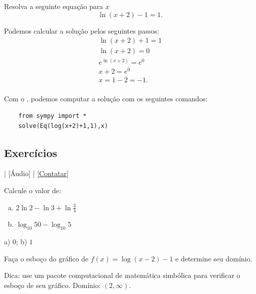\begin{exeresol}
  Resolva a seguinte equação para $x$
  \begin{equation}
    \ln(x+2) - 1 = 1. 
  \end{equation}
\end{exeresol}
\begin{resol}
  Podemos calcular a solução pelos seguintes passos:
  \begin{gather}
    \ln(x+2)+1=1\\
    \ln(x+2)=0\\
    e^{\ln(x+2)} = e^0\\
    x+2=e^0\\
    x=1-2=-1.\\
  \end{gather}

  \ifispython
  Com o {\sympy}, podemos computar a solução com os seguintes comandos:
  \begin{lstlisting}
    from sympy import *
    solve(Eq(log(x+2)+1,1),x)
  \end{lstlisting}
  \fi
\end{resol}

\subsection*{Exercícios}

\begin{flushright}
  [Vídeo] | [Áudio] | \href{https://phkonzen.github.io/notas/contato.html}{[Contatar]}
\end{flushright}

\begin{exer}
  Calcule o valor de:
  \begin{enumerate}[a)]
  \item $2\ln 2 - \ln 3 + \ln \frac{3}{4}$
  \item $\log_{10} 50 - \log_{10} 5$
  \end{enumerate}
\end{exer}
\begin{resp}
  a) $0$; b) $1$
\end{resp}

\begin{exer}
  Faça o esboço do gráfico de $f(x) = \log(x-2)-1$ e determine seu domínio.
\end{exer}
\begin{resp}
  Dica: use um pacote computacional de matemática simbólica para verificar o esboço de seu gráfico. Domínio: $(2, \infty)$.
\end{resp}

